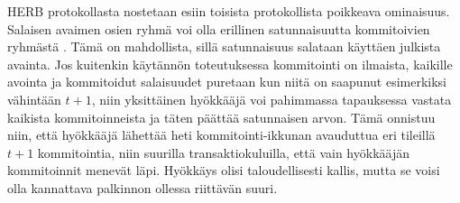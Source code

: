HERB protokollasta nostetaan esiin toisista protokollista poikkeava ominaisuus. Salaisen avaimen osien ryhmä voi olla erillinen satunnaisuutta kommitoivien ryhmästä \cite{cherniaeva2019homomorphic}. Tämä on mahdollista, sillä satunnaisuus salataan käyttäen julkista avainta. Jos kuitenkin käytännön toteutuksessa kommitointi on ilmaista, kaikille avointa ja kommitoidut salaisuudet puretaan kun niitä on saapunut esimerkiksi vähintään $t+1$, niin yksittäinen hyökkääjä voi pahimmassa tapauksessa vastata kaikista kommitoinneista ja täten päättää satunnaisen arvon. Tämä onnistuu niin, että hyökkääjä lähettää heti kommitointi-ikkunan avauduttua eri tileillä $t+1$ kommitointia, niin suurilla transaktiokuluilla, että vain hyökkääjän kommitoinnit menevät läpi. Hyökkäys olisi taloudellisesti kallis, mutta se voisi olla kannattava palkinnon ollessa riittävän suuri.